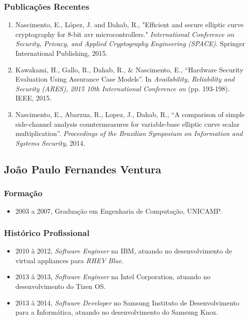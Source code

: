 \documentclass[12pt]{article}
\begin{document}
\subsubsection*{Publicações Recentes}

\begin{enumerate}\setlength\itemsep{1pt}
    \item Nascimento, E., López, J. and Dahab, R., "Efficient and secure elliptic curve cryptography for 8-bit avr microcontrollers." \textsl{International Conference on Security, Privacy, and Applied Cryptography Engineering (SPACE)}. Springer International Publishing, 2015. 
    \item Kawakami, H., Gallo, R., Dahab, R., \& Nascimento, E., “Hardware Security Evaluation Using Assurance Case Models”. In \textsl{Availability, Reliability and Security (ARES), 2015 10th International Conference on} (pp. 193-198). IEEE, 2015.
    \item Nascimento, E., Abarzua, R., Lopez, J., Dahab, R., “A comparison of simple side-channel analysis countermeasures for variable-base elliptic curve scalar multiplication”. \textsl{Proceedings of the Brazilian Symposium on Information and Systems Security}, 2014.
\end{enumerate}

\subsection{João Paulo Fernandes Ventura}

\subsubsection{Formação}
\begin{itemize}\setlength\itemsep{1pt}
\item 2003 a 2007, Graduação em Engenharia de Computação, UNICAMP.
\end{itemize}

\subsubsection{Histórico Profissional}
\begin{itemize}\setlength\itemsep{1pt}
\item 2010 à 2012, \textit{Software Engineer} na IBM, atuando no desenvolvimento de virtual appliances para \textit{RHEV Blue}.
\item 2013 à 2013, \textit{Software Engineer} na Intel Corporation, atuando no desenvolvimento do Tizen OS.
\item 2013 à 2014, \textit{Software Developer} no Samsung Instituto de Desenvolvimento para a Informática, atuando no desenvolvimento do Samsung Knox.
\end{itemize}
\end{document}
